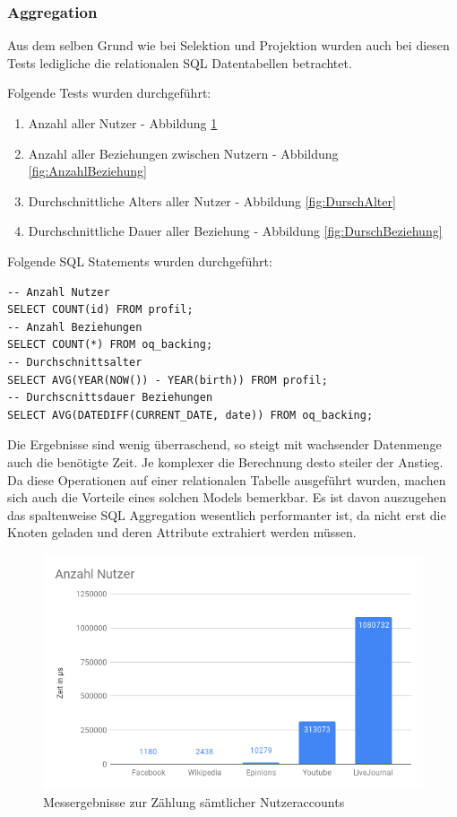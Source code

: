 \subsubsection{Aggregation}
Aus dem selben Grund wie bei Selektion und Projektion wurden auch bei diesen Tests ledigliche die relationalen SQL Datentabellen betrachtet.

Folgende Tests wurden durchgeführt:
\begin{enumerate}
	\item Anzahl aller Nutzer - Abbildung \ref{fig:AnzahlNutzer}
	\item Anzahl aller Beziehungen zwischen Nutzern - Abbildung \ref{fig:AnzahlBeziehung}
	\item Durchschnittliche Alters aller Nutzer - Abbildung \ref{fig:DurschAlter}
	\item Durchschnittliche Dauer aller Beziehung - Abbildung \ref{fig:DurschBeziehung}
\end{enumerate}

Folgende SQL Statements wurden durchgeführt:
\begin{lstlisting}
-- Anzahl Nutzer
SELECT COUNT(id) FROM profil;
-- Anzahl Beziehungen
SELECT COUNT(*) FROM oq_backing;
-- Durchschnittsalter
SELECT AVG(YEAR(NOW()) - YEAR(birth)) FROM profil;
-- Durchscnittsdauer Beziehungen
SELECT AVG(DATEDIFF(CURRENT_DATE, date)) FROM oq_backing;
\end{lstlisting}

Die Ergebnisse sind wenig überraschend, so steigt mit wachsender Datenmenge auch die benötigte Zeit. Je komplexer die Berechnung desto steiler der Anstieg. Da diese Operationen auf einer relationalen Tabelle ausgeführt wurden, machen sich auch die Vorteile eines solchen Models bemerkbar. Es ist davon auszugehen das spaltenweise SQL Aggregation wesentlich performanter ist, da nicht erst die Knoten geladen und deren Attribute extrahiert werden müssen.

\begin{figure}
	\centering
	\includegraphics[width=\textwidth]{images/AnzahlNutzer.png}
	\caption{Messergebnisse zur Zählung sämtlicher Nutzeraccounts}
	\label{fig:AnzahlNutzer}
\end{figure}

